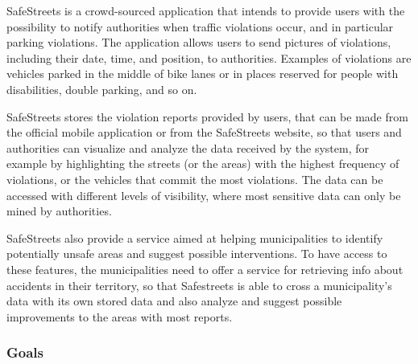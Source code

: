 SafeStreets is a crowd-sourced application that intends to provide users with the possibility to notify authorities when traffic violations occur, and in particular parking violations. The application allows users to send pictures of violations, including their date, time, and position, to authorities. Examples of violations are vehicles parked in the middle of bike lanes or in places reserved for people with disabilities, double parking, and so on.

SafeStreets stores the violation reports provided by users, that can be made from the official mobile application or from the SafeStreets website, so that users and authorities can visualize and analyze the data received by the system, for example by highlighting the streets (or the areas) with the highest frequency of violations, or the vehicles that commit the most violations. The data can be accessed with different levels of visibility, where most sensitive data can only be mined by authorities.

SafeStreets also provide a service aimed at helping municipalities to identify potentially unsafe areas and suggest possible interventions. To have access to these features, the municipalities need to offer a service for retrieving info about accidents in their territory, so that Safestreets is able to cross a municipality's data with its own stored data and also analyze and suggest possible improvements to the areas with most reports.
\subsubsection{Goals}
\begin{enumerate}[label={G\arabic*.}]
     \label{G_report_auth}
     \label{G_interventions}
     \label{G_inst_registration}
     \label{G_visualization}
    \begin{enumerate}[label={G\arabic{enumi}.\arabic*.}]
    	 \label{G_visualization_cit}
    	 \label{G_visualization_auth}
    \end{enumerate}
	 \label{G_accept_reports}
	 \label{G_check_info}
\end{enumerate}
